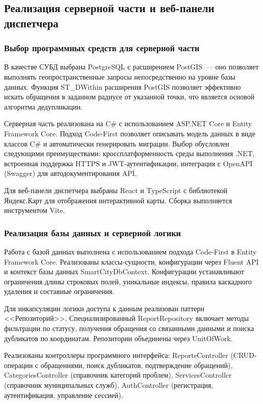 \subsection{Реализация серверной части и веб-панели диспетчера}

\subsubsection{Выбор программных средств для серверной части}

В качестве СУБД выбрана PostgreSQL с расширением PostGIS~--- оно позволяет выполнять геопространственные запросы непосредственно на уровне базы данных. Функция ST\_DWithin расширения PostGIS позволяет эффективно искать обращения в заданном радиусе от указанной точки, что является основой алгоритма дедупликации.

Серверная часть реализована на C\# с использованием ASP.NET Core и Entity Framework Core. Подход Code-First позволяет описывать модель данных в виде классов C\# и автоматически генерировать миграции. Выбор обусловлен следующими преимуществами: кроссплатформенность среды выполнения .NET, встроенная поддержка HTTPS и JWT-аутентификации, интеграция с OpenAPI (Swagger) для автодокументирования API.

Для веб-панели диспетчера выбраны React и TypeScript с библиотекой Яндекс.Карт для отображения интерактивной карты. Сборка выполняется инструментом Vite.

\subsubsection{Реализация базы данных и серверной логики}

Работа с базой данных выполнена с использованием подхода Code-First в Entity Framework Core. Реализованы классы-сущности, конфигурации через Fluent API и контекст базы данных SmartCityDbContext. Конфигурации устанавливают ограничения длины строковых полей, уникальные индексы, правила каскадного удаления и составные ограничения.

Для инкапсуляции логики доступа к данным реализован паттерн <<Репозиторий>>. Специализированный ReportRepository включает методы фильтрации по статусу, получения обращения со связанными данными и поиска дубликатов по координатам. Репозитории объединены через UnitOfWork.

Реализованы контроллеры программного интерфейса: ReportsController (CRUD-операции с обращениями, поиск дубликатов, подтверждение обращений), CategoriesController (справочник категорий проблем), ServicesController (справочник муниципальных служб), AuthController (регистрация, аутентификация, управление сессией).

